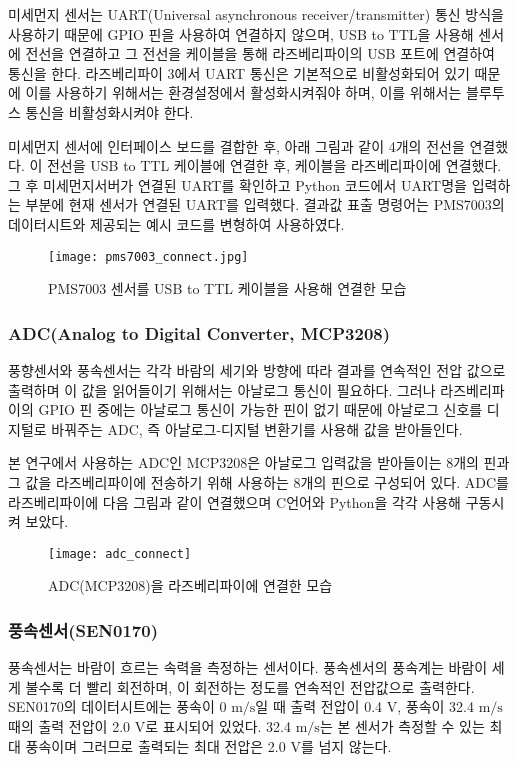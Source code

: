 미세먼지 센서는 UART(Universal asynchronous receiver/transmitter) 통신 방식을 사용하기 때문에 GPIO 핀을 사용하여 연결하지 않으며, USB to TTL을 사용해 센서에 전선을 연결하고 그 전선을 케이블을 통해 라즈베리파이의 USB 포트에 연결하여 통신을 한다. 라즈베리파이 3에서 UART 통신은 기본적으로 비활성화되어 있기 때문에 이를 사용하기 위해서는 환경설정에서 활성화시켜줘야 하며, 이를 위해서는 블루투스 통신을 비활성화시켜야 한다.

미세먼지 센서에 인터페이스 보드를 결합한 후, 아래 그림과 같이 4개의 전선을 연결했다. 이 전선을 USB to TTL 케이블에 연결한 후, 케이블을 라즈베리파이에 연결했다. 그 후 미세먼지서버가 연결된 UART를 확인하고 Python 코드에서 UART명을 입력하는 부분에 현재 센서가 연결된 UART를 입력했다. 결과값 표출 명령어는 PMS7003의 데이터시트와 제공되는 예시 코드를 변형하여 사용하였다.

\begin{figure}[htbp]
	\centering
	\texttt{[image: pms7003\_connect.jpg]}
	\caption{PMS7003 센서를 USB to TTL 케이블을 사용해 연결한 모습}
	\label{PMS7003}
\end{figure}

\subsubsection{ADC(Analog to Digital Converter, MCP3208)}
풍향센서와 풍속센서는 각각 바람의 세기와 방향에 따라 결과를 연속적인 전압 값으로 출력하며 이 값을 읽어들이기 위해서는 아날로그 통신이 필요하다. 그러나 라즈베리파이의 GPIO 핀 중에는 아날로그 통신이 가능한 핀이 없기 때문에 아날로그 신호를 디지털로 바꿔주는 ADC, 즉 아날로그-디지털 변환기를 사용해 값을 받아들인다. 

본 연구에서 사용하는 ADC인 MCP3208은 아날로그 입력값을 받아들이는 8개의 핀과 그 값을 라즈베리파이에 전송하기 위해 사용하는 8개의 핀으로 구성되어 있다. ADC를 라즈베리파이에 다음 그림과 같이 연결했으며 C언어와 Python을 각각 사용해 구동시켜 보았다.

\begin{figure}[htbp]
	\centering
	\texttt{[image: adc\_connect]}
	\caption{ADC(MCP3208)을 라즈베리파이에 연결한 모습}
	\label{ADCCON}
\end{figure}

\subsubsection{풍속센서(SEN0170)}
풍속센서는 바람이 흐르는 속력을 측정하는 센서이다. 풍속센서의 풍속계는 바람이 세게 불수록 더 빨리 회전하며, 이 회전하는 정도를 연속적인 전압값으로 출력한다. SEN0170의 데이터시트에는 풍속이 0 $\textrm{m/s}$일 때 출력 전압이 0.4 $\textrm{V}$, 풍속이 32.4 $\textrm{m/s}$ 때의 출력 전압이 2.0 $\textrm{V}$로 표시되어 있었다. 32.4 $\textrm{m/s}$는 본 센서가 측정할 수 있는 최대 풍속이며 그러므로 출력되는 최대 전압은 2.0 $\textrm{V}$를 넘지 않는다. 

